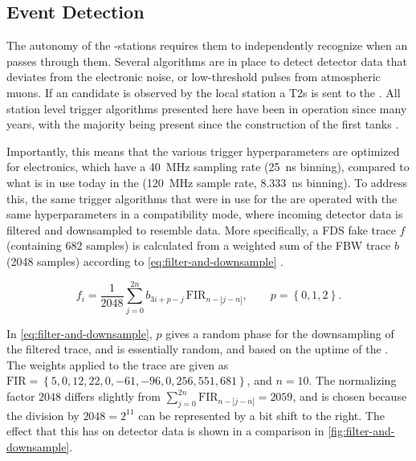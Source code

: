 \subsection{Event Detection}
\label{ssec:sd-triggers}

The autonomy of the \SD-stations requires them to independently recognize when
an \EAS passes through them. Several algorithms are in place to detect detector
data that deviates from the electronic noise, or low-threshold pulses from 
atmospheric muons. If an \EAS candidate is observed by the local station a 
\acfp{T2} is sent to the \CDAS. All station level trigger algorithms presented 
here have been in operation since many years, with the majority being present 
since the construction of the first \WCD tanks 
\cite{thepierreaugercollaborationPierreAugerObservatory1997}. 

Importantly, this means that the various trigger hyperparameters are optimized 
for \UB electronics, which have a \SI{40}{\mega\hertz} sampling rate 
(\SI{25}{\nano\second} binning), compared to what is in use today in the \UUB 
(\SI{120}{\mega\hertz} sample rate, \SI{8.333}{\nano\second} binning). To 
address this, the same trigger algorithms that were in use for the \UB are 
operated with the same hyperparameters in a compatibility mode, where incoming 
\UUB detector data is filtered and downsampled to resemble \UB data. More 
specifically, a \acf{FDS} fake \UB trace $f$ (containing 682 samples) is 
calculated from a weighted sum of the \acf{FBW} trace $b$ (2048 samples) 
according to \cref{eq:filter-and-downsample} 
\cite{convengaLocalStationCalibrationDummies2023}.

\begin{equation}
\label{eq:filter-and-downsample} 
f_i = \frac{1}{2048} \sum^{2 n}_{j = 0} b_{3i+p-j} \, \mathrm{FIR}_{n - \left| j-n \right|}, \qquad p = \left\{ 0, 1, 2 \right\}.
\end{equation}

In \cref{eq:filter-and-downsample}, $p$ gives a random phase for the 
downsampling of the filtered trace, and is essentially random, and based on the
uptime of the \FPGA. The \FIR weights applied to the \FBW trace are given as
$\mathrm{FIR} = \left\{ 5, 0, 12, 22, 0, -61, -96, 0, 256, 551, 681 \right\}$, 
and $n=10$. The normalizing factor $2048$ differs slightly from 
$\sum^{2n}_{j=0} \mathrm{FIR}_{n-\left| j-n \right|} = 2059$, and is chosen 
because the division by $2048 = 2^{11}$ can be represented by a bit shift to 
the right. The effect that this has on detector data is shown in a comparison 
in \cref{fig:filter-and-downsample}.

